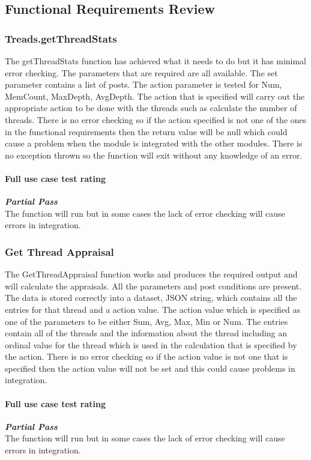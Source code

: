 \subsection{Functional Requirements Review}
\subsubsection{Treads.getThreadStats}
The getThreadStats function has achieved what it needs to do but it has minimal error checking. The parameters that are required are all available. The set parameter contains a list of posts. The action parameter is tested for Num, MemCount, MaxDepth, AvgDepth. The action that is specified will carry out the appropriate action to be done with the threads such as calculate the number of threads. There is no error checking so if the action specified is not one of the ones in the functional requirements then the return value will be null which could cause a problem when the module is integrated with the other modules. There is no exception thrown so the function will exit without any knowledge of an error.
\paragraph{\color{black} Full use case test rating\\}
\color{myOrange}
\textbf{\small \emph{Partial Pass}} \\
\color{black} The function will run but in some cases the lack of error checking will cause errors in integration.
\subsubsection{Get Thread Appraisal}
The GetThreadAppraisal function works and produces the required output and will calculate the appraisals. All the parameters and post conditions are present. The data is stored correctly into a dataset, JSON string, which contains all the entries for that thread and a action value. The action value which is specified as one of the parameters to be either Sum, Avg, Max, Min or Num. The entries contain all of the threads and the information about the thread including an ordinal value for the thread which is used in the calculation that is specified by the action. There is no error checking so if the action value is not one that is specified then the action value will not be set and this could cause problems in integration.
\paragraph{\color{black} Full use case test rating\\}
\color{myOrange}
\textbf{\small \emph{Partial Pass}} \\
\color{black} The function will run but in some cases the lack of error checking will cause errors in integration.

